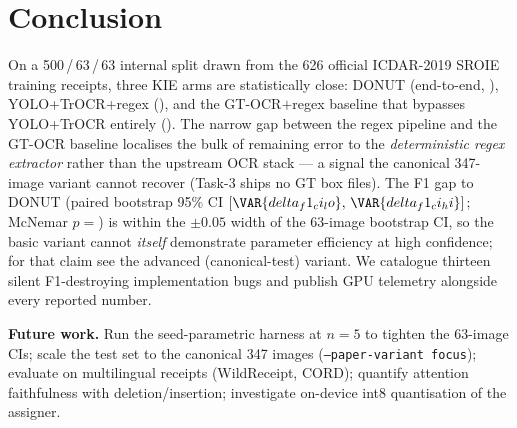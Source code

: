 \section{Conclusion}

On a 500\,/\,63\,/\,63 internal split drawn from the 626 official
ICDAR-2019 SROIE training receipts, three KIE arms are
statistically close: DONUT (end-to-end,
), YOLO+TrOCR+regex
(), and the
GT-OCR$+$regex baseline that bypasses YOLO+TrOCR entirely
().  The narrow gap between
the regex pipeline and the GT-OCR baseline localises the bulk of
remaining error to the \emph{deterministic regex extractor}
rather than the upstream OCR stack --- a signal the canonical
347-image variant cannot recover (Task-3 ships no GT box files).
The  F1 gap to DONUT (paired bootstrap 95\% CI
$[\VAR{delta_f1_ci_lo},\,\VAR{delta_f1_ci_hi}]$; McNemar
$p=$) is within the $\pm 0.05$ width of the
63-image bootstrap CI, so the basic variant cannot \emph{itself}
demonstrate parameter efficiency at high confidence; for that
claim see the advanced (canonical-test) variant.  We catalogue
thirteen silent F1-destroying implementation bugs and publish GPU
telemetry alongside every reported number.

\textbf{Future work.}
Run the seed-parametric harness at $n{=}5$ to tighten the 63-image
CIs; scale the test set to the canonical 347 images
(\texttt{--paper-variant focus}); evaluate on multilingual
receipts (WildReceipt, CORD); quantify attention faithfulness with
deletion/insertion; investigate on-device int8 quantisation of the
assigner.
